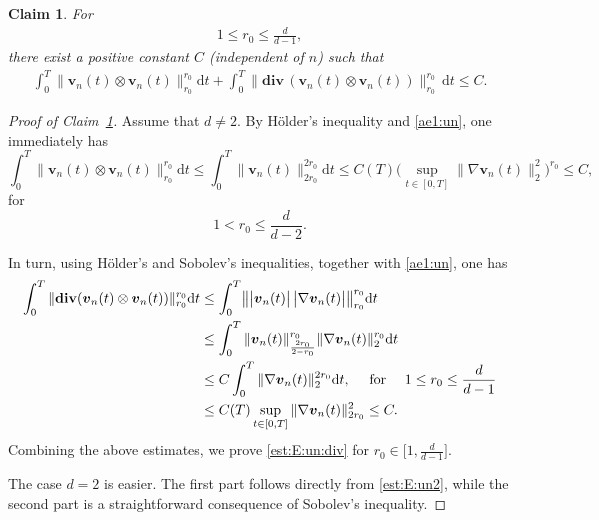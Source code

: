 \documentclass[12pt,reqno]{amsart}
\numberwithin{equation}{section}
\newtheorem{claim}{Claim}
\let\originalleft\left
\let\originalright\right
\renewcommand{\left}{\mathopen{}\mathclose\bgroup\originalleft}
\renewcommand{\right}{\aftergroup\egroup\originalright}
\theoremstyle{definition}
\def\d{\mathrm{d}}
\def\dt{\,\mathrm{d}t}
\def\divv{\mathbf{div}\,}
\def\vv{\boldsymbol{v}}
\begin{document}
{\begin{claim}\label{claim:4}
For
\begin{align}\label{est:E:un:div2}
1\leq r_0\leq \frac{d}{d-1},
\end{align}
there exist a positive constant $C$ (independent of $n$) such that
 \begin{align}\label{est:E:un:div}
	\int_{0}^{T}\|\vv_n(t)\otimes\vv_n(t)\|^{r_0}_{r_0}\d t+\int_{0}^{T}\|\divv\!(\vv_n(t)\otimes\vv_n(t))\|^{r_0}_{r_0}\dt\leq C .
\end{align}
\end{claim}
}

\begin{proof}[Proof of Claim~\ref{claim:4}]
Assume that $d\not=2$. By H\"older's inequality and \eqref{ae1:un}, one immediately has
\begin{equation*}%
\int_{0}^{T}\|\vv_n(t)\otimes\vv_n(t)\|^{r_0}_{r_0}\d t\leq \int_{0}^{T}\|\vv_n(t)\|^{2r_0}_{2r_0}\d t
\leq {  C(T)\bigg(\sup_{t\in[0,T]}\|\nabla\vv_n(t)\|^{2}_{2}\bigg)^{r_0}}\leq C,
\end{equation*}
for
\begin{equation*}%
1<r_0\leq\frac{d}{d-2}.
\end{equation*}

In turn, using H\"older's and Sobolev's inequalities, together with \eqref{ae1:un}, one has
\begin{equation*}
\begin{split}
 \int_{0}^{T}\|\divv\!(\vv_n(t)\otimes\vv_n(t))\|^{r_0}_{r_0}\d t & \leq
\int_{0}^{T}\left\|\big|\vv_n(t)\big|\,\big|\nabla\vv_n(t)\big|\right\|^{r_0}_{r_0}\d t \\
& \leq \int_{0}^{T}\|\vv_n(t)\|_{\frac{2r_0}{2-r_0}}^{r_0}\|\nabla\vv_n(t)\|_{2}^{r_0}\d t\\&
\leq C \int_0^T \|\nabla \vv_n(t)\|_{2}^{2r_0}\d t, \quad \text{ for } \quad 1\leq r_0\leq \frac{d}{d-1}
\\& \leq   C(T)\sup_{t\in[0,T]}\|\nabla\vv_n(t)\|^{2}_{2r_0}
 \leq C.
\end{split}
\end{equation*}
Combining the above estimates, we prove \eqref{est:E:un:div} for $r_0\in \Big[1,\frac{d}{d-1}\Big]$.

The case $d=2$ is easier.
The first part follows directly from \eqref{est:E:un2}, while the second part is a straightforward consequence of Sobolev’s inequality.
\end{proof}
\end{document}
